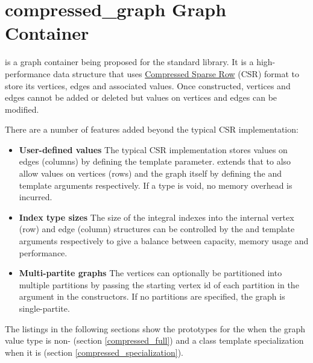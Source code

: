 
\clearpage

\section{compressed\_graph Graph Container}
 is a graph container being proposed for the standard library. It is a high-performance data structure that 
uses \href{https://en.wikipedia.org/wiki/Sparse_matrix#Compressed_sparse_row_\%28CSR\%2C_CRS_or_Yale_format\%29}{Compressed Sparse Row} 
(CSR) format to store its vertices, edges and associated values. Once constructed, vertices and edges cannot be added or deleted 
but values on vertices and edges can be modified.

There are a number of features added beyond the typical CSR implementation:
\begin{itemize}
    \item   \textbf{User-defined values} The typical CSR implementation stores values on edges (columns) by defining the 
            template parameter.  extends that to also allow values on vertices (rows) and the graph itself 
            by defining the  and  template arguments respectively. If a type is void, no memory overhead is incurred.
    \item   \textbf{Index type sizes} The size of the integral indexes into the internal vertex (row) and edge (column) structures can be 
            controlled by the  and  template arguments respectively to give a balance between capacity, memory 
            usage and performance.
    \item   \textbf{Multi-partite graphs} The vertices can optionally be partitioned into multiple partitions by passing the 
            starting vertex id of each partition in the  argument in the constructors. If no partitions are
            specified, the graph is single-partite.
\end{itemize}

The listings in the following sections show the prototypes for the  when the graph value type  is 
non- (section \ref{compressed_full}) and a class template specialization when it is  (section \ref{compressed_specialization}).

